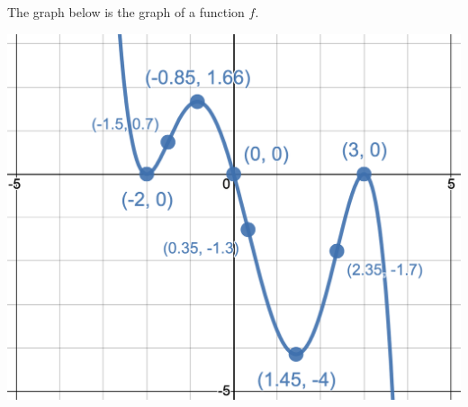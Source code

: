 \documentclass{siproblemset}
\begin{document}
    \begin{multipartquestion}{The graph below is the graph of a function $f$.}
        \begin{multicols}{2}
            \begin{center}
                \includegraphics[width=\linewidth]{img/pt3-graph2}
            \end{center}
            \vfill\null
            \columnbreak
            \ \newline
            \ \newline
            \ \newline
        \end{multicols}
    \end{multipartquestion}
    
\end{document}
